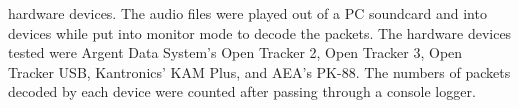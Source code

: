 hardware devices. The audio files were played out of a PC soundcard and into devices while put into monitor mode to decode the packets. The hardware devices tested were Argent Data System's Open Tracker 2, Open Tracker 3, Open Tracker USB, Kantronics' KAM Plus, and AEA's PK-88. The numbers of packets decoded by each device were counted after passing through a console logger.
